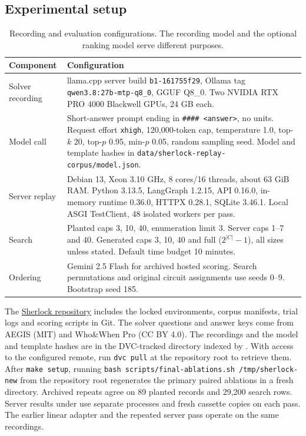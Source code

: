 \documentclass[11pt,letterpaper]{article}
\begin{document}
\subsection{Experimental setup}
\begin{table}[htbp]\centering\small
\caption{Recording and evaluation configurations. The recording model and the optional ranking model serve different purposes.}
\begin{tabular}{@{}p{.24\linewidth}p{.69\linewidth}@{}}\toprule
Component & Configuration\\\midrule
Solver recording & llama.cpp server build \texttt{b1-161755f29}, Ollama tag \texttt{qwen3.8:27b-mtp-q8\_0}, GGUF Q8\_0. Two NVIDIA RTX PRO 4000 Blackwell GPUs, 24 GB each.\\
Model call & Short-answer prompt ending in \texttt{\#\#\#\# <answer>}, no units. Request effort \texttt{xhigh}, 120,000-token cap, temperature 1.0, top-$k$ 20, top-$p$ 0.95, min-$p$ 0.05, random sampling seed. Model and template hashes in \texttt{data/sherlock-replay-corpus/model.json}.\\
Server replay & Debian 13, Xeon 3.10 GHz, 8 cores/16 threads, about 63 GiB RAM. Python 3.13.5, LangGraph 1.2.15, API 0.16.0, in-memory runtime 0.36.0, HTTPX 0.28.1, SQLite 3.46.1. Local ASGI TestClient, 48 isolated workers per pass.\\
Search & Planted caps 3, 10, 40, enumeration limit 3. Server caps 1--7 and 40. Generated caps 3, 10, 40 and full ($2^{|C|}-1$), all sizes unless stated. Default time budget 10 minutes.\\
Ordering & Gemini 2.5 Flash for archived hosted scoring. Search permutations and original circuit assignments use seeds 0--9. Bootstrap seed 185.\\\bottomrule
\end{tabular}\end{table}

The \href{https://github.com/aliaankhowaja/sherlock-research}{Sherlock repository} includes the locked environments, corpus manifests, trial logs and scoring scripts in Git. The solver questions and answer keys come from AEGIS (MIT) and Who\&When Pro (CC BY 4.0). The recordings and the model and template hashes are in the DVC-tracked directory indexed by . With access to the configured remote, run \texttt{dvc pull} at the repository root to retrieve them. After \texttt{make setup}, running \texttt{bash scripts/final-ablations.sh /tmp/sherlock-new} from the repository root regenerates the primary paired ablations in a fresh directory. Archived repeats agree on 89 planted records and 29,200 search rows. Server results under  use separate processes and fresh cassette copies on each pass. The earlier linear adapter and the repeated server pass operate on the same recordings.
\end{document}
